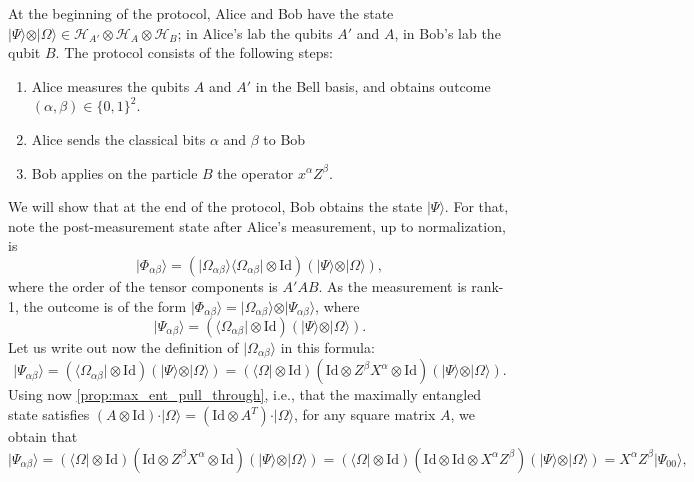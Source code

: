 \documentclass{article}
\theoremstyle{definition}
\newcommand{\id}{\mathrm{Id}}
\newcommand{\ket}[1]{\vert #1 \rangle}
\newcommand{\bra}[1]{\langle #1 \vert}
\begin{document}
At the beginning of the protocol, Alice and Bob have the state $\ket{\Psi}\otimes\ket{\Omega}\in \mathcal{H}_{A'} \otimes \mathcal{H}_{A}\otimes \mathcal{H}_B$; in Alice's lab the qubits $A'$ and $A$, in Bob's lab the qubit $B$. The protocol consists of the following steps:
\begin{enumerate}
  \item Alice measures the qubits $A$ and $A'$ in the Bell basis, and obtains outcome $(\alpha,\beta)\in\{0,1\}^2$.
  \item  Alice sends the classical bits $\alpha$ and $\beta$ to Bob
  \item  Bob applies on the particle $B$ the operator $x^\alpha Z^\beta$. 
\end{enumerate}
We will show that at the end of the protocol, Bob obtains the state $\ket{\Psi}$. For that, note the post-measurement state after Alice's measurement, up to normalization, is 
\begin{equation*}
   \ket{\Phi_{\alpha\beta}} = (\ket{\Omega_{\alpha\beta}}\bra{\Omega_{\alpha\beta}} \otimes\id) (\ket{\Psi} \otimes \ket{\Omega}),
\end{equation*}
where the order of the tensor components is $A'AB$. As the measurement is rank-1, the outcome is of the form $\ket{\Phi_{\alpha\beta}} = \ket{\Omega_{\alpha\beta}}\otimes \ket{\Psi_{\alpha\beta}}$, where
\begin{equation*}
     \ket{\Psi_{\alpha\beta}} = (\bra{\Omega_{\alpha\beta}} \otimes\id) (\ket{\Psi} \otimes \ket{\Omega}).
\end{equation*}
 Let us write out now the definition of $\ket{\Omega_{\alpha \beta}}$ in this formula:
\begin{equation*}
  \ket{\Psi_{\alpha\beta}} = (\bra{\Omega_{\alpha\beta}} \otimes\id) (\ket{\Psi} \otimes \ket{\Omega}) = (\bra{\Omega} \otimes\id) (\id \otimes Z^\beta X^\alpha\otimes\id) (\ket{\Psi} \otimes \ket{\Omega}).
\end{equation*}
Using now \cref{prop:max_ent_pull_through}, i.e., that the maximally entangled state satisfies $(A\otimes \id) \cdot \ket{\Omega} = (\id\otimes A^T) \cdot\ket{\Omega}$, for any square matrix $A$, we obtain that 
\begin{equation*}
  \ket{\Psi_{\alpha\beta}} =  (\bra{\Omega} \otimes\id) (\id \otimes Z^\beta X^\alpha \otimes\id) (\ket{\Psi} \otimes \ket{\Omega}) =  (\bra{\Omega} \otimes\id) (\id \otimes \id \otimes X^\alpha Z^\beta ) (\ket{\Psi} \otimes \ket{\Omega}) = X^\alpha Z^\beta\ket{\Psi_{00}},
\end{equation*}
\end{document}
